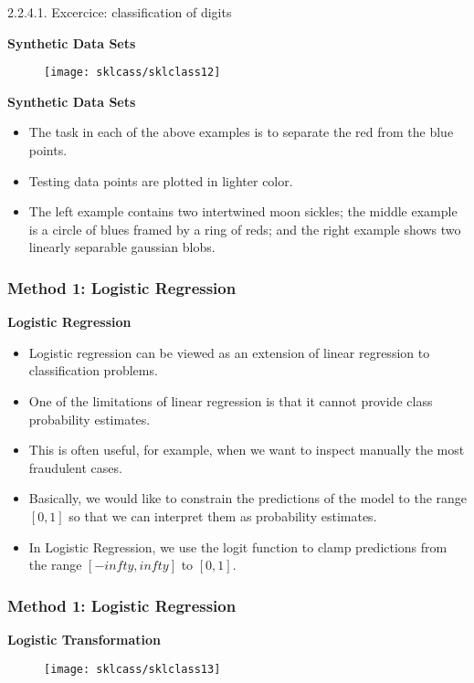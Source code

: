 2.2.4.1. Excercice: classification of digits\documentclass[MASTER.tex]{subfiles}
\begin{document}

	\textbf{Synthetic Data Sets}
\begin{figure}
\centering
\texttt{[image: sklcass/sklclass12]}

\end{figure}


\textbf{Synthetic Data Sets}
\begin{itemize}
\item The task in each of the above examples is to separate the red from the blue points. 
\item Testing data points are plotted in lighter color. 
\item The left example contains two intertwined moon sickles; the middle example is a circle of blues framed by a ring of reds; and the right example shows two linearly separable gaussian blobs.
\end{itemize}




		\frametitle{Method 1: Logistic Regression}
\textbf{Logistic Regression}
\begin{itemize}
\item Logistic regression can be viewed as an extension of linear regression to classification problems. \item One of the limitations of linear regression is that it cannot provide class probability estimates. 
\item This is often useful, for example, when we want to inspect manually the most fraudulent cases. 
\item Basically, we would like to constrain the predictions of the model to the range $[0,1]$ so that we can interpret them as probability estimates. 
\item In Logistic Regression, we use the logit function to clamp predictions from the range $[−infty,infty]$ to $[0,1]$. 
\end{itemize}



		\frametitle{Method 1: Logistic Regression}
	\textbf{Logistic Transformation}
	\begin{figure}
\centering
\texttt{[image: sklcass/sklclass13]}

\end{figure}
\end{document}
